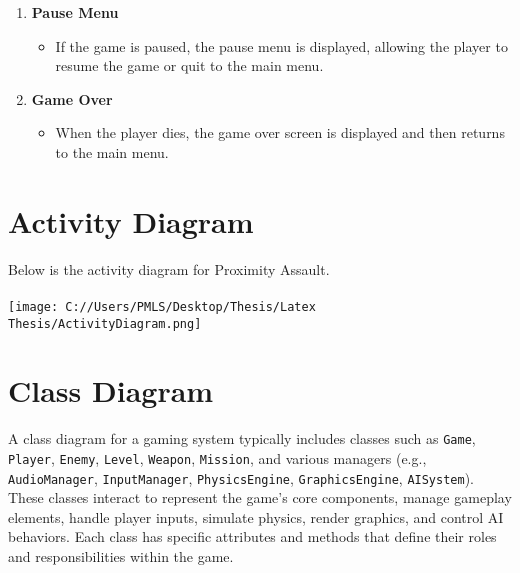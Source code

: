 \begin{enumerate}
	\item \textbf{Pause Menu}
	\begin{itemize}
		\item If the game is paused, the pause menu is displayed, allowing the player to resume the game or quit to the main menu.
	\end{itemize}
	
	\item \textbf{Game Over}
	\begin{itemize}
		\item When the player dies, the game over screen is displayed and then returns to the main menu.
	\end{itemize}
\end{enumerate}
\section{Activity Diagram}
Below is the activity diagram for Proximity Assault.
\\
\\
\texttt{[image: C://Users/PMLS/Desktop/Thesis/Latex Thesis/ActivityDiagram.png]}
\\
\section{Class Diagram}

A class diagram for a gaming system typically includes classes such as \texttt{Game}, \texttt{Player}, \texttt{Enemy}, \texttt{Level}, \texttt{Weapon}, \texttt{Mission}, and various managers (e.g., \texttt{AudioManager}, \texttt{InputManager}, \texttt{PhysicsEngine}, \texttt{GraphicsEngine}, \texttt{AISystem}). These classes interact to represent the game's core components, manage gameplay elements, handle player inputs, simulate physics, render graphics, and control AI behaviors. Each class has specific attributes and methods that define their roles and responsibilities within the game.

